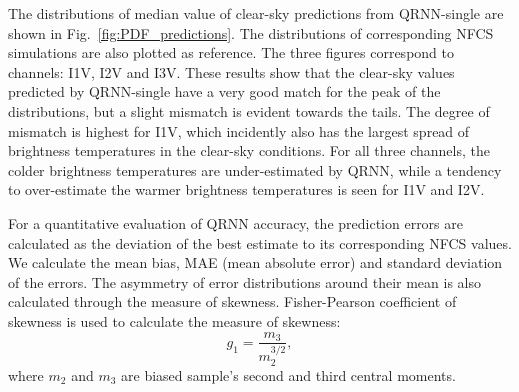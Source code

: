 \documentclass[amt, manuscript]{copernicus}
\begin{document}
The distributions of median value of clear-sky predictions from QRNN-single are shown in Fig.~\ref{fig:PDF_predictions}. The distributions of corresponding NFCS simulations are also plotted as reference. The three figures correspond to channels: I1V, I2V and I3V. These results show that the clear-sky values predicted by QRNN-single have a very good match for the peak of the distributions, but a slight mismatch is evident towards the tails. The degree of mismatch is highest for I1V, which incidently also has the largest spread of brightness temperatures in the clear-sky conditions. For all three channels, the colder brightness temperatures are under-estimated by QRNN, while a tendency to over-estimate the warmer brightness temperatures is seen for I1V and I2V.  
  
For a quantitative evaluation of QRNN accuracy, the prediction errors are calculated as the deviation of the best estimate to its corresponding NFCS values. We calculate the mean bias, MAE (mean absolute error) and standard deviation of the errors. The asymmetry of error distributions around their mean is also calculated through the measure of skewness. Fisher-Pearson coefficient of skewness is used to calculate the measure of skewness: 
\begin{equation}
g_1 = \frac{m_3}{m_2^{3/2}}, 
\end{equation}
where $m_2$ and $m_3$ are biased sample's second and third central moments. 
\end{document}
